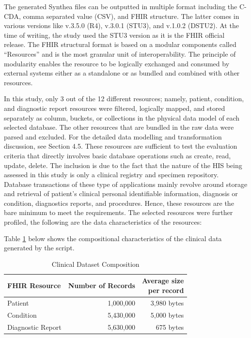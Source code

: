 \documentclass[5p]{elsarticle}
\begin{document}
The generated Synthea files can be outputted in multiple format including the C-CDA, comma separated value (CSV), and FHIR structure. 
The latter comes in various versions like v.3.5.0 (R4), v.3.0.1 (STU3), and v.1.0.2 (DSTU2). At the time of writing, 
the study used the STU3 version as it is the FHIR official release. The FHIR structural format is based on a modular components called “Resources” 
and is the most granular unit of interoperability. The principle of modularity enables the resource to be logically 
exchanged and consumed by external systems either as a standalone or as bundled and combined with other resources. 

In this study, only 3 out of the 12 different resources; namely, patient, condition, and diagnostic report resources were filtered, logically mapped,
and stored separately as column, buckets, or collections in the physical data model of each selected database. 
The other resources that are bundled in the raw data were parsed and excluded. For the detailed data modelling and transformation discussion, 
see Section 4.5.
These resources are sufficient to test the evaluation criteria that directly involves basic database operations such as create, read, update, delete. 
The inclusion is due to the fact that the nature of the HIS being assessed in this study is only a clinical registry and specimen repository.
Database transactions of these type of applications mainly revolve around storage and retrieval of patient’s clinical personal identifiable information,
diagnosis or condition, diagnostics reports, and procedures. Hence, these resources are the bare minimum to meet the requirements.
The selected resources were further profiled, the following are the data characteristics of the resources:

Table \ref{table.dataset.composition} below shows the compositional characteristics of the clinical data generated by the script. 

\begin{table}[!hbp]
    \centering
    \caption[l]{Clinical Dataset Composition}
     \label{table.dataset.composition}
        \begin{tabular}{lrr}
        \toprule
        FHIR Resource & Number of Records & \makecell[c]{Average size \\per record} \\
        \hline
        Patient           & 1,000,000 & 3,980 bytes \\
        Condition         & 5,430,000 & 5,000 bytes \\
        Diagnostic Report & 5,630,000 & 675 bytes \\
        \hline
    \end{tabular}
\end{table}
\end{document}
